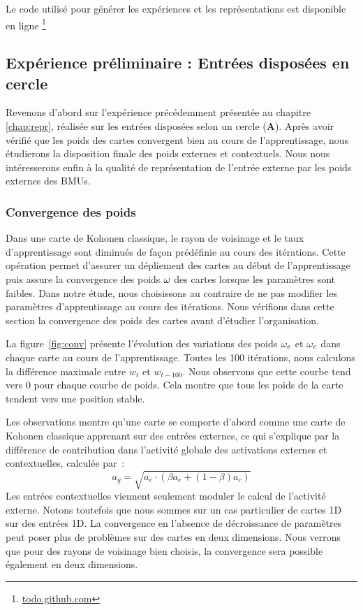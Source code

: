 \documentclass[../main]{subfiles}
\begin{document}
Le code utilisé pour générer les expériences et les représentations est disponible en ligne \footnote{\url{todo.github.com}}

\subsection{Expérience préliminaire : Entrées disposées en cercle}

Revenons d'abord sur l'expérience précédemment présentée au chapitre \ref{chap:repr}, réalisée sur les entrées disposées selon un cercle (\textbf{A}).
Après avoir vérifié que les poids des cartes convergent bien au cours de l'apprentissage, nous étudierons la disposition finale des poids externes et contextuels.
Nous nous intéresserons enfin à la qualité de représentation de l'entrée externe par les poids externes des BMUs.

\subsubsection{Convergence des poids}

Dans une carte de Kohonen classique, le rayon de voisinage et le taux d'apprentissage sont diminués de façon prédéfinie au cours des itérations. 
Cette opération permet d'assurer un dépliement des cartes au début de l'apprentissage puis assure la convergence des poids $\omega$ des cartes lorsque les paramètres sont faibles.
Dans notre étude, nous choisissons au contraire de ne pas modifier les paramètres d'apprentissage au cours des itérations.
Nous vérifions dans cette section la convergence des poids des cartes avant d'étudier l'organisation. 

La figure~\ref{fig:conv} présente l'évolution des variations des poids $\omega_{e}$ et $\omega_{c}$ dans chaque carte au cours de l'apprentissage. Toutes les 100 itérations, nous calculons la différence maximale entre $w_t$ et $w_{t-100}$.
Nous observons que cette courbe tend vers $0$ pour chaque courbe de poids. Cela montre que tous les poids de la carte tendent vers une position stable.

Les observations montre qu'une carte se comporte d'abord comme une carte de Kohonen classique apprenant sur des entrées externes, ce qui s'explique par la différence de contribution dans l'activité globale des activations externes et contextuelles, calculée par~: 
$$ a_g = \sqrt{a_e \cdot (\beta a_e + (1-\beta)a_c)}$$
Les entrées contextuelles viennent seulement moduler le calcul de l'activité externe.
Notons toutefois que nous sommes sur un cas particulier de cartes 1D sur des entrées 1D.
La convergence en l'absence de décroissance de paramètres peut poser plus de problèmes sur des cartes en deux dimensions. 
Nous verrons que pour des rayons de voisinage bien choisis, la convergence sera possible également en deux dimensions.
\end{document}
